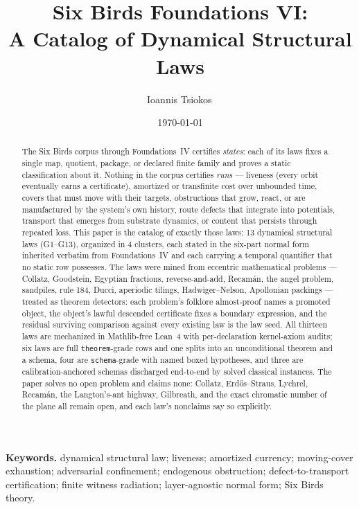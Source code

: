 \documentclass[11pt]{article}
\title{Six Birds Foundations VI:\\
A Catalog of Dynamical Structural Laws}
\author{Ioannis Tsiokos\,\orcidlink{0009-0009-7659-5964}}
\date{\today}
\newcommand{\FoundIV}{Foundations~IV}
\newcommand{\NumLaws}{13}
\newcommand{\NumClusters}{4}
\theoremstyle{definition}
\begin{document}
\sloppy
{}

\maketitle
\thispagestyle{firstpage}

\begin{abstract}
The Six Birds corpus through \FoundIV{} certifies \emph{states}: each of its laws fixes a single map,
quotient, package, or declared finite family and proves a static classification about it. Nothing in
the corpus certifies \emph{runs} --- liveness (every orbit eventually earns a certificate), amortized
or transfinite cost over unbounded time, covers that must move with their targets, obstructions that
grow, react, or are manufactured by the system's own history, route defects that integrate into
potentials, transport that emerges from substrate dynamics, or content that persists through repeated
loss. This paper is the catalog of exactly those laws: \NumLaws{} dynamical structural laws
(G1--G13), organized in \NumClusters{} clusters, each stated in the six-part normal form inherited
verbatim from \FoundIV{} and each carrying a temporal quantifier that no static row possesses. The
laws were mined from eccentric mathematical problems --- Collatz, Goodstein, Egyptian fractions,
reverse-and-add, Recam\'an, the angel problem, sandpiles, rule 184, Ducci, aperiodic tilings,
Hadwiger--Nelson, Apollonian packings --- treated as theorem detectors: each problem's folklore
almost-proof names a promoted object, the object's lawful descended certificate fixes a boundary
expression, and the residual surviving comparison against every existing law is the law seed. All
thirteen laws are mechanized in Mathlib-free Lean~4 with per-declaration kernel-axiom audits; six
laws are full \texttt{theorem}-grade rows and one splits into an unconditional theorem and a schema,
four are \texttt{schema}-grade with named boxed hypotheses, and three are calibration-anchored
schemas discharged end-to-end by solved classical instances. The paper solves no open problem and
claims none: Collatz, Erd\H{o}s--Straus, Lychrel, Recam\'an, the Langton's-ant highway, Gilbreath,
and the exact chromatic number of the plane all remain open, and each law's nonclaims say so
explicitly.
\end{abstract}

\medskip
\noindent\textbf{Keywords.} dynamical structural law; liveness; amortized currency; moving-cover
exhaustion; adversarial confinement; endogenous obstruction; defect-to-transport certification; finite
witness radiation; layer-agnostic normal form; Six Birds theory.
\end{document}

